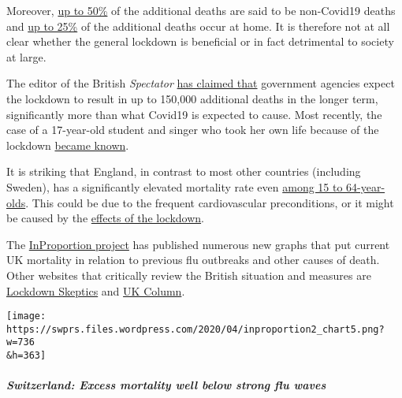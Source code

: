 Moreover,
\href{https://www.thetimes.co.uk/edition/news/coronavirus-record-weekly-death-toll-as-fearful-patients-avoid-hospitals-bm73s2tw3}{up
to 50\%} of the additional deaths are said to be non-Covid19 deaths and
\href{https://www.ft.com/content/67e6a4ee-3d05-43bc-ba03-e239799fa6ab}{up
to 25\%} of the additional deaths occur at home. It is therefore not at
all clear whether the general lockdown is beneficial or in fact
detrimental to society at large.

The editor of the British \emph{Spectator}
\href{https://www.telegraph.co.uk/politics/2020/04/09/boris-worried-lockdown-has-gone-far-can-end/}{has
claimed that} government agencies expect the lockdown to result in up to
150,000 additional deaths in the longer term, significantly more than
what Covid19 is expected to cause. Most recently, the case of a
17-year-old student and singer who took her own life because of the
lockdown
\href{https://sports.yahoo.com/coronavirus-bethany-palmer-teenager-death-suicide-152707750.html}{became
known}.

It is striking that England, in contrast to most other countries
(including Sweden), has a significantly elevated mortality rate even
\href{https://www.euromomo.eu/}{among 15 to 64-year-olds}. This could be
due to the frequent cardiovascular preconditions, or it might be caused
by the
\href{https://www.telegraph.co.uk/global-health/science-and-disease/two-new-waves-deaths-break-nhs-new-analysis-warns/}{effects
of the lockdown}.

The \href{http://inproportion2.talkigy.com/}{InProportion project} has
published numerous new graphs that put current UK mortality in relation
to previous flu outbreaks and other causes of death. Other websites that
critically review the British situation and measures are
\href{https://lockdownsceptics.org/}{Lockdown Skeptics} and
\href{https://www.ukcolumn.org/}{UK Column}.

\texttt{[image: https://swprs.files.wordpress.com/2020/04/inproportion2\_chart5.png?w=736\\\&h=363]}

\hypertarget{switzerland-excess-mortality-well-below-strong-flu-waves}{%
\subparagraph{\texorpdfstring{\textbf{Switzerland: Excess mortality well
below strong flu
waves}}{Switzerland: Excess mortality well below strong flu waves}}\label{switzerland-excess-mortality-well-below-strong-flu-waves}}

